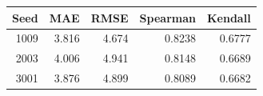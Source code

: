 \begin{tabular}{rrrrr}
\toprule
Seed & MAE & RMSE & Spearman & Kendall\\
\midrule
1009 & 3.816 & 4.674 & 0.8238 & 0.6777 \\
2003 & 4.006 & 4.941 & 0.8148 & 0.6689 \\
3001 & 3.876 & 4.899 & 0.8089 & 0.6682 \\
\bottomrule
\end{tabular}
